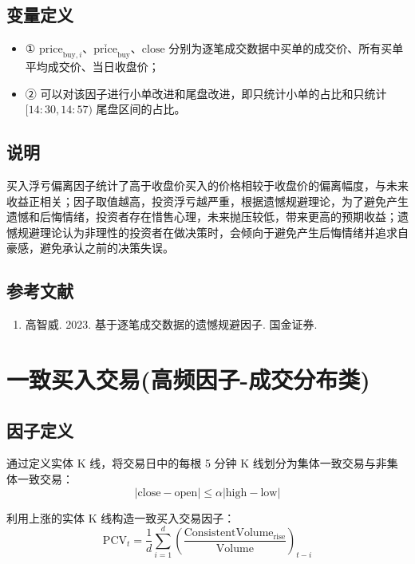 \documentclass{article}
\begin{document}
\subsection{变量定义}

\begin{itemize}
    \item ① \( \mathrm{price}_{\mathrm{buy},i} \)、\( \overline{\mathrm{price}}_{\mathrm{buy}} \)、\( \mathrm{close} \) 分别为逐笔成交数据中买单的成交价、所有买单平均成交价、当日收盘价；
    \item ② 可以对该因子进行小单改进和尾盘改进，即只统计小单的占比和只统计 \([14:30,14:57)\) 尾盘区间的占比。
\end{itemize}

\subsection{说明}
买入浮亏偏离因子统计了高于收盘价买入的价格相较于收盘价的偏离幅度，与未来收益正相关；因子取值越高，投资浮亏越严重，根据遗憾规避理论，为了避免产生遗憾和后悔情绪，投资者存在惜售心理，未来抛压较低，带来更高的预期收益；遗憾规避理论认为非理性的投资者在做决策时，会倾向于避免产生后悔情绪并追求自豪感，避免承认之前的决策失误。

\subsection{参考文献}
\begin{enumerate}
    \item 高智威. 2023. 基于逐笔成交数据的遗憾规避因子. 国金证券.
\end{enumerate}

\section{一致买入交易(高频因子-成交分布类)}

\subsection{因子定义}

通过定义实体 K 线，将交易日中的每根 5 分钟 K 线划分为集体一致交易与非集体一致交易：
\begin{equation}
    |\mathrm{close} - \mathrm{open}| \leq \alpha |\mathrm{high} - \mathrm{low}|
\end{equation}

利用上涨的实体 K 线构造一致买入交易因子：
\begin{equation}
    \mathrm{PCV}_t = \frac{1}{d} \sum_{i=1}^{d} \left( \frac{\mathrm{ConsistentVolume}_{\mathrm{rise}}}{\mathrm{Volume}} \right)_{t-i}
\end{equation}
\end{document}
